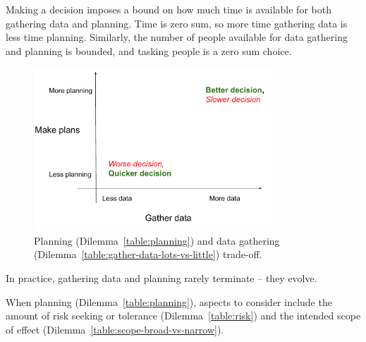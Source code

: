 Making a decision imposes a bound on how much time is available for both gathering data and planning. Time is zero sum, so more time gathering data is less time planning. Similarly, the number of people available for data gathering and planning is bounded, and tasking people is a zero sum choice.

\begin{figure}[H] %
    \centering
    \includegraphics[width=0.8\textwidth]{images/planning_and_data_gathering.pdf}
    \caption{Planning (Dilemma~\ref{table:planning}) and data gathering (Dilemma~\ref{table:gather-data-lots-vs-little}) trade-off.}
    \label{fig:pareto_frontier}
\end{figure}

In practice, gathering data and planning rarely terminate -- they evolve.




When planning (Dilemma~\ref{table:planning}), aspects to consider include
the amount of risk seeking or tolerance (Dilemma~\ref{table:risk})
and
the intended scope of effect  (Dilemma~\ref{table:scope-broad-vs-narrow}).

